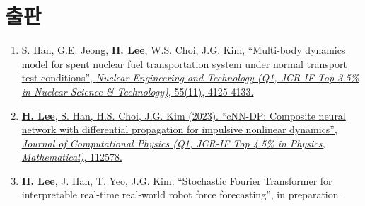 \documentclass[a4paper,10pt]{extarticle}
\begin{document}
\section*{출판}
\noindent
\begin{enumerate}[leftmargin=.5cm]
    \item \href{https://www.google.com/url?sa=t&rct=j&q=&esrc=s&source=web&cd=&cad=rja&uact=8&ved=2ahUKEwij36zWpNKCAxXMMEQIHSBfBMUQFnoECBEQAQ&url=https%3A%2F%2Fwww.sciencedirect.com%2Fscience%2Farticle%2Fpii%2FS1738573323003492&usg=AOvVaw1zj_G3k5c77uhMNnmu0EEC&opi=89978449}{S. Han, G.E. Jeong, \textbf{H. Lee}, W.S. Choi, J.G. Kim, “Multi-body dynamics model for spent nuclear fuel transportation system under normal transport test conditions”, \textit{Nuclear Engineering and Technology (Q1, JCR-IF Top 3.5\% in Nuclear Science \& Technology)}, 55(11), 4125-4133.}
    \item \href{https://www.sciencedirect.com/science/article/pii/S0021999123006733?casa_token=ARUkhI8XI8YAAAAA:wTzCIauJvSlonWw-J-SlAFqPX6NZRQS-qBX59l4YN5O3caEppoglU0duVmMkZYf4nWYd7tm_D_E}{\textbf{H. Lee}, S. Han, H.S. Choi, J.G. Kim (2023). “cNN-DP: Composite neural network with differential propagation for impulsive nonlinear dynamics”, \textit{Journal of Computational Physics (Q1, JCR-IF Top 4.5\% in Physics, Mathematical)}, 112578.}
    \item \textbf{H. Lee}, J. Han, T. Yeo, J.G. Kim. “Stochastic Fourier Transformer for interpretable real-time real-world robot force forecasting”, in preparation.
\end{enumerate}

\end{document}
